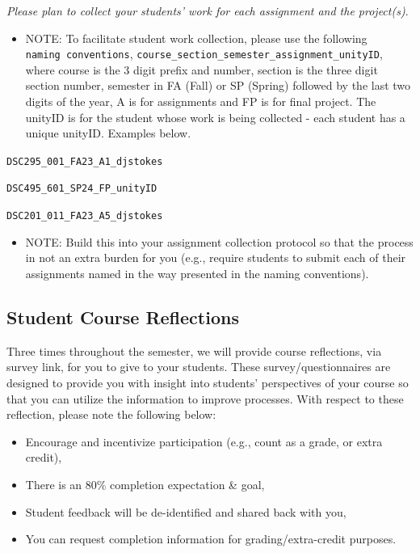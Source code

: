 \documentclass[
]{book}
\providecommand{\tightlist}{%
  \setlength{\itemsep}{0pt}\setlength{\parskip}{0pt}}
\begin{document}
{ \emph{Please plan to collect your students' work for each assignment and the project(s)}. }

\begin{itemize}
\tightlist
\item
  NOTE: To facilitate student work collection, please use the following \texttt{naming\ conventions}, \texttt{course\_section\_semester\_assignment\_unityID}, where course is the 3 digit prefix and number, section is the three digit section number, semester in FA (Fall) or SP (Spring) followed by the last two digits of the year, A is for assignments and FP is for final project. The unityID is for the student whose work is being collected - each student has a unique unityID. Examples below.
\end{itemize}

\texttt{DSC295\_001\_FA23\_A1\_djstokes}

\texttt{DSC495\_601\_SP24\_FP\_unityID}

\texttt{DSC201\_011\_FA23\_A5\_djstokes}

\begin{itemize}
\tightlist
\item
  NOTE: Build this into your assignment collection protocol so that the process in not an extra burden for you (e.g., require students to submit each of their assignments named in the way presented in the naming conventions).
\end{itemize}

\hypertarget{student-course-reflections}{%
\subsection{Student Course Reflections}\label{student-course-reflections}}

Three times throughout the semester, we will provide course reflections, via survey link, for you to give to your students. These survey/questionnaires are designed to provide you with insight into students' perspectives of your course so that you can utilize the information to improve processes. With respect to these reflection, please note the following below:

\begin{itemize}
\tightlist
\item
  Encourage and incentivize participation (e.g., count as a grade, or extra credit),
\item
  There is an 80\% completion expectation \& goal,
\item
  Student feedback will be de-identified and shared back with you,
\item
  You can request completion information for grading/extra-credit purposes.
\end{itemize}
\end{document}

